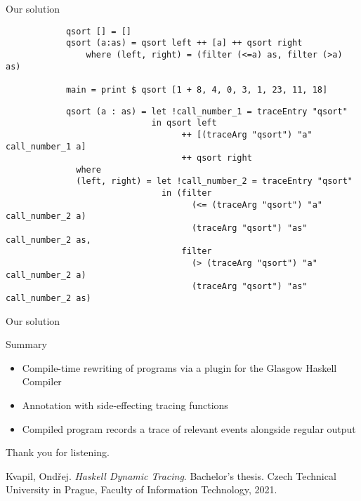 \documentclass[aspectratio=169]{beamer}
\begin{document}
\begin{frame}[fragile]{Our solution}
	\begin{overprint}
		\begin{verbatim}
			qsort [] = []
			qsort (a:as) = qsort left ++ [a] ++ qsort right
				where (left, right) = (filter (<=a) as, filter (>a) as)

			main = print $ qsort [1 + 8, 4, 0, 3, 1, 23, 11, 18]
		\end{verbatim}

		\begin{verbatim}
			qsort (a : as) = let !call_number_1 = traceEntry "qsort"
			                 in qsort left
			                       ++ [(traceArg "qsort") "a" call_number_1 a]
			                       ++ qsort right
			  where
			  (left, right) = let !call_number_2 = traceEntry "qsort"
			                   in (filter
			                         (<= (traceArg "qsort") "a" call_number_2 a)
			                         (traceArg "qsort") "as" call_number_2 as,
			                       filter
			                         (> (traceArg "qsort") "a" call_number_2 a)
			                         (traceArg "qsort") "as" call_number_2 as)
		\end{verbatim}

	\end{overprint}
\end{frame}

\begin{frame}{Our solution}
\end{frame}

\begin{frame}{Summary}
	\begin{itemize}
		\item Compile-time \alert{rewriting of programs} via a plugin for
			the Glasgow Haskell Compiler \pause
		\item Annotation with side-effecting tracing functions \pause
		\item Compiled program records a trace of relevant events alongside
			regular output
	\end{itemize}
\end{frame}

\begin{frame}{}
	Thank you for listening.

	
	\begin{thebibliography}{1}
		Kvapil, Ondřej.
		\textit{Haskell Dynamic Tracing}.
		Bachelor's thesis.
		Czech Technical University in Prague,
		Faculty of Information Technology, 2021.
	\end{thebibliography}
\end{frame}
\end{document}
